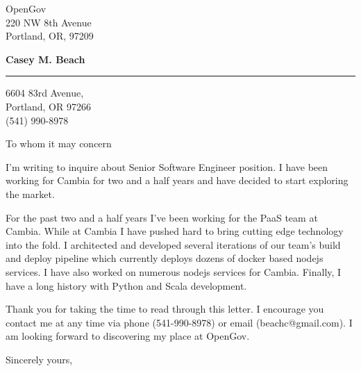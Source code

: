 \documentclass{letter} %
\begin{document}
\signature{Casey M. Beach}           %
\longindentation=0pt                       %
\let\raggedleft\raggedright                %
 
 
\begin{letter}{
OpenGov \\
220 NW 8th Avenue \\
Portland, OR, 97209 \\
}

\begin{center}
{\large\bf Casey M. Beach}
\end{center}
\medskip\hrule height 1pt
\begin{center}
6604 83rd Avenue,\\
Portland, OR 97266 \\
(541) 990-8978 
\end{center} 
\vspace{1in}

 
\opening{To whom it may concern} 
\begin{flushleft} 

\noindent I'm writing to inquire about Senior Software Engineer position. I have 
been working for Cambia for two and a half years and have decided to start exploring the market.

\noindent For the past two and a half years I've been working for the PaaS team at Cambia. While at Cambia I have pushed hard
to bring cutting edge technology into the fold. I architected and developed several iterations of our team's build and 
deploy pipeline which currently deploys dozens of docker based nodejs services. I have also worked on numerous nodejs services
for Cambia. Finally, I have a long history with Python and Scala development.

\noindent Thank you for taking the time to read through this letter. I encourage you
contact me at any time via phone (541-990-8978) or email (beachc@gmail.com). I am looking forward to 
discovering my place at OpenGov.

\end{flushleft}
\closing{Sincerely yours,} 
\vfill %
\end{letter}
\end{document}
